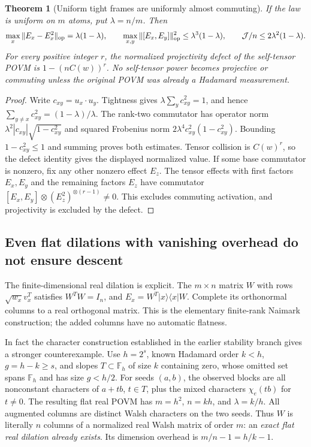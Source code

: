 \documentclass[11pt]{article}
\newtheorem{theorem}{Theorem}[section]
\begin{document}
\begin{theorem}[Uniform tight frames are uniformly almost commuting]
If the law is uniform on $m$ atoms, put $\lambda=n/m$. Then
\[
 \max_x\|E_x-E_x^2\|_{\rm op}=\lambda(1-\lambda),\qquad
 \max_{x,y}\|[E_x,E_y]\|_{\rm op}^2
 \le\lambda^3(1-\lambda),\qquad
 \mathcal J/n\le2\lambda^2(1-\lambda).
\]
For every positive integer $r$, the normalized projectivity defect
of the self-tensor POVM is $1-(nC(w))^r$.
No self-tensor power becomes projective or commuting unless the
original POVM was already a Hadamard measurement.
\end{theorem}
\begin{proof}
Write $c_{xy}=u_x\cdot u_y$. Tightness gives
$\lambda\sum_yc_{xy}^2=1$, and hence
$\sum_{y\ne x}c_{xy}^2=(1-\lambda)/\lambda$.
The rank-two commutator has operator norm
$\lambda^2|c_{xy}|\sqrt{1-c_{xy}^2}$ and squared Frobenius norm
$2\lambda^4c_{xy}^2(1-c_{xy}^2)$. Bounding $1-c_{xy}^2\le1$
and summing proves both estimates. Tensor collision is $C(w)^r$,
so the defect identity gives the displayed normalized value.
If some base commutator is nonzero, fix any other nonzero effect $E_z$.
The tensor effects with first factors $E_x,E_y$ and the remaining
factors $E_z$ have commutator
$[E_x,E_y]\otimes(E_z^2)^{\otimes(r-1)}\ne0$. This excludes
commuting activation, and projectivity is excluded by the defect.
\end{proof}

\subsection{Even flat dilations with vanishing overhead do not ensure descent}
The finite-dimensional real dilation is explicit. The $m\times n$
matrix $W$ with rows $\sqrt{w_x}v_x^T$ satisfies $W^TW=I_n$, and
$E_x=W^T|x\rangle\langle x|W$. Complete its orthonormal columns to
a real orthogonal matrix. This is the elementary finite-rank
Naimark construction; the added columns have no automatic flatness.

In fact the character construction established in the earlier
stability branch gives a stronger counterexample. Use $h=2^s$,
known Hadamard order $k<h$, $g=h-k\ge s$, and slopes
$T\subset\mathbb F_h$ of size $k$ containing zero, whose omitted
set spans $\mathbb F_h$ and has size $g<h/2$.
For seeds $(a,b)$, the observed blocks are all nonconstant characters
of $a+tb$, $t\in T$, plus the mixed characters $\chi_e(tb)$ for
$t\ne0$. The resulting flat real POVM has
$m=h^2$, $n=kh$, and $\lambda=k/h$.
All augmented columns are distinct Walsh characters on the two
seeds. Thus $W$ is literally $n$ columns of a normalized real Walsh
matrix of order $m$: an \emph{exact flat real dilation already exists}.
Its dimension overhead is $m/n-1=h/k-1$.
\end{document}
